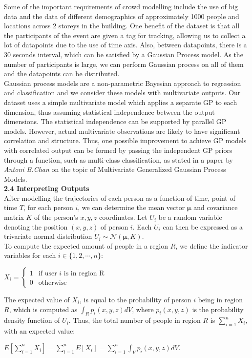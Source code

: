 \documentclass[letterpaper]{article}
\begin{document}
Some of the important requirements of crowd modelling include the use of big data and the data of different demographics of approximately 1000 people and locations across 2 storeys in the building. One benefit of the dataset is that all the participants of the event are given a tag for tracking, allowing us to collect a lot of datapoints due to the use of time axis. Also, between datapoints, there is a 30 seconds interval, which can be satisfied by a Gaussian Process model. As the number of participants is large, we can perform Gaussian process on all of them and the datapoints can be distributed. \\

Gaussian process models are a non-parametric Bayesian approach to regression and classification and we consider these models with multivariate outputs. Our dataset uses a simple multivariate model which applies a separate GP to each dimension, thus assuming statistical independence between the output dimensions. The statistical independence can be supported by parallel GP models. However, actual multivariate observations are likely to have significant correlation and structure. Thus, one possible improvement to achieve GP models with correlated output can be formed by passing the independent GP priors through a function, such as multi-class classification, as stated in a paper by {\it Antoni B.Chan} on the topic of Multivariate Generalized Gaussian Process Models. \\


{\bf2.4  Interpreting  Outputs} \\

After modelling the trajectories of each person as a function of time, point of time $T$, for each person $i$, we can determine the mean vector $\boldsymbol{\mu}$ and covariance matrix $K$ of the person's $x,y,z$ coordinates. Let $U_i$ be a random variable denoting the position $(x,y,z)$ of person $i$. Each $U_i$ can then be expressed as a trivariate normal distribution $U_i \sim \mathcal{N}(\boldsymbol{\mu},K)$.\\

To compute the expected amount of people in a region $R$, we define the indicator variables for each $i \in \{1,2,\cdots,n\}$:
\begin{center}
$X_i =
\begin{cases}
    1 &\text{if user }i\text{ is in region R}\\
    0 &\text{otherwise}
\end{cases}$
\end{center}
The expected value of $X_i$, is equal to the probability of person $i$ being in region $R$, which is computed as $\int_R p_i(x,y,z)dV$, where $p_i(x,y,z)$ is the probability density function of $U_i$. Thus, the total number of people in region $R$ is $\sum_{i=1}^n X_i$, with an expected value:
\begin{center}
$\displaystyle E[\sum_{i=1}^n X_i] = \sum_{i=1}^n E[X_i] = \sum_{i=1}^n \int_V p_i(x,y,z)dV$.
\end{center}
\end{document}
